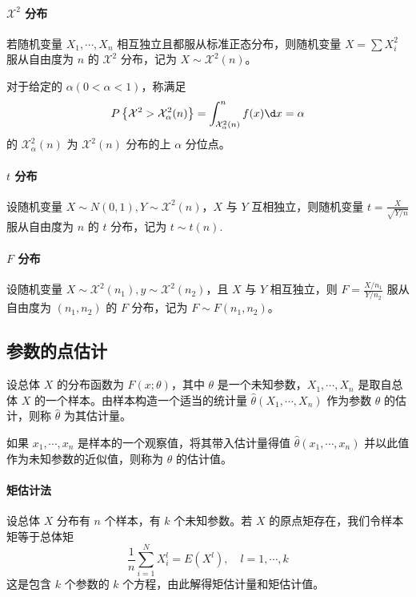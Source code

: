 \newcommand{\calX}{\mathcal{X}}

\paragraph{$\calX^2$ 分布}

若随机变量 $X_1, \cdots, X_n$ 相互独立且都服从标准正态分布，则随机变量 $X = \sum X_i^2$ 服从自由度为 $n$ 的 $\calX^2$ 分布，记为 $X \sim \calX^2(n)$。

对于给定的 $\alpha(0 < \alpha < 1)$，称满足
\[ P\left\{\calX^2 > \calX_\alpha^2(n)\right\} = \int_{\calX_\alpha^2(n)}^n f(x) \d x = \alpha  \]
的 $\calX_\alpha^2(n)$ 为 $\calX^2(n)$ 分布的上 $\alpha$ 分位点。

\paragraph{$t$ 分布}

设随机变量 $X \sim N(0, 1), Y \sim \calX^2(n)$，$X$ 与 $Y$ 互相独立，则随机变量 $t = \frac{X}{\sqrt{Y / n}}$ 服从自由度为 $n$ 的 $t$ 分布，记为 $t \sim t(n)$.

\paragraph{$F$ 分布}

设随机变量 $X \sim \calX^2(n_1), y \sim \calX^2(n_2)$，且 $X$ 与 $Y$ 相互独立，则 $F = \frac{X / n_1}{Y / n_2}$ 服从自由度为 $(n_1, n_2)$ 的 $F$ 分布，记为 $F \sim F(n_1, n_2)$。

\subsection{参数的点估计}

设总体 $X$ 的分布函数为 $F(x; \theta)$，其中 $\theta$ 是一个未知参数，$X_1, \cdots, X_n$ 是取自总体 $X$ 的一个样本。由样本构造一个适当的统计量 $\hat{\theta}(X_1, \cdots, X_n)$ 作为参数 $\theta$ 的估计，则称 $\hat{\theta}$ 为其估计量。

如果 $x_1, \cdots, x_n$ 是样本的一个观察值，将其带入估计量得值 $\hat{\theta}(x_1, \cdots, x_n)$ 并以此值作为未知参数的近似值，则称为 $\theta$ 的估计值。

\paragraph{矩估计法}

设总体 $X$ 分布有 $n$ 个样本，有 $k$ 个未知参数。若 $X$ 的原点矩存在，我们令样本矩等于总体矩
\[ \frac{1}{n} \sum_{i=1}^{N} X_i^l = E(X^l), \quad l = 1, \cdots, k \]
这是包含 $k$ 个参数的 $k$ 个方程，由此解得矩估计量和矩估计值。

